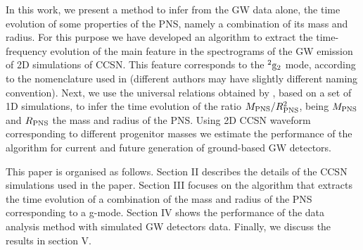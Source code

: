 {In this work, we present a method to infer from the GW data alone, the time evolution of some properties of the PNS, namely a combination of its mass and radius. For this purpose we have developed an algorithm to  
extract the time-frequency evolution of the main feature in the spectrograms of the GW emission of 2D simulations of CCSN. This feature corresponds to the $^2\rm{g}_2$ mode, according to the nomenclature used in \citep{Torres:2019b} (different authors may have slightly different naming convention). Next, we use the universal relations obtained by \citep{Torres:2019b}{, based on a set of 1D simulations,} to infer the time evolution of the ratio $M_{\rm PNS}/R_{\rm PNS}^2$, being 
$M_{\rm PNS}$ and $R_{\rm PNS}$ the mass and radius of the PNS.} Using 2D CCSN waveform corresponding to different progenitor masses we estimate the performance of the algorithm for current and future generation of ground-based GW detectors.

This paper is organised as follows. Section II describes the details of the CCSN simulations used in the paper. Section III focuses on the algorithm that extracts the time evolution of a combination of the mass and radius of the PNS corresponding to a g-mode. Section IV shows the performance of the data analysis method with simulated GW detectors data. Finally, we discuss the results in section V.


